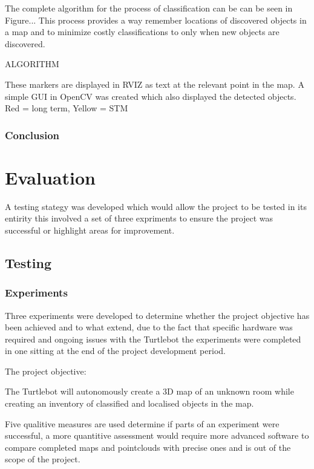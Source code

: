 \documentclass{mproj}
\begin{document}
The complete algorithm for the process of classification can be can be seen in Figure... This process provides a way remember locations of discovered objects in a map and to minimize costly classifications to only when new objects are discovered. 

ALGORITHM

These markers are displayed in RVIZ as text at the relevant point in the map. A simple GUI in OpenCV was created which also displayed the detected objects.
Red = long term, Yellow = STM

\subsection{Conclusion}


\chapter{Evaluation}

A testing stategy was developed which would allow the project to be tested in its entirity this involved a set of three expriments to ensure the project was successful or highlight areas for improvement.

\section{Testing}
\subsection{Experiments}

Three experiments were developed to determine whether the project objective has been achieved and to what extend, due to the fact that specific hardware was required and ongoing issues with the Turtlebot the experiments were completed in one sitting at the end of the project development period. 

The project objective: 

The Turtlebot will autonomously create a 3D map of an unknown room while creating an inventory of classified and localised objects in the map.

Five qualitive measures are used determine if parts of an experiment were successful, a more quantitive assessment would require more advanced software to compare completed maps and pointclouds with precise ones and is out of the scope of the project. 
\end{document}
